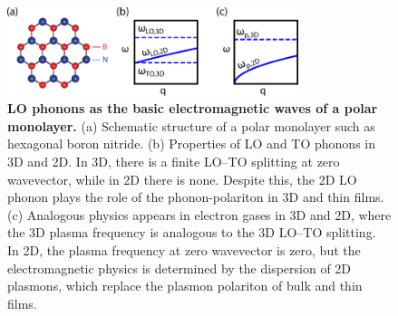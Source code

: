 \documentclass[aps,prb,twocolumn,
	           groupedaddress,superscriptaddress,
               amsfonts,amssymb,amsmath,floatfix,
	           citeautoscript]{revtex4-1}
\newcommand{\comment}[2]{%
    \ifbool{togglecomments}%
    {\textcolor{blue!70!black}{\small\textsf{%
    \textsuperscript{\textsc{\textsf{\MakeLowercase{#1}}}}%
    [#2]}}} %
    {}}     %
\begin{document}
\begin{figure}[t]
    \includegraphics[width=85mm]{fig1.pdf}
    \caption{%
        \textbf{LO phonons as the basic electromagnetic waves of a polar monolayer.} (a) Schematic structure of a polar monolayer such as hexagonal boron nitride. (b) Properties of LO and TO phonons in 3D and 2D. In 3D, there is a finite LO--TO splitting at zero wavevector, while in 2D there is none. Despite this, the 2D LO phonon plays the role of the phonon-polariton in 3D and thin films. (c) Analogous physics appears in electron gases in 3D and 2D, where the 3D plasma frequency is analogous to the 3D LO--TO splitting. In 2D, the plasma frequency at zero wavevector is zero, but the electromagnetic physics is determined by the dispersion of 2D plasmons, which replace the plasmon polariton of bulk and thin films.
        \label{fig:1}
        }
\end{figure}~




\end{document}
